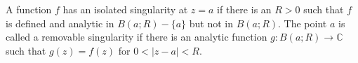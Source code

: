 A function $f$ has an isolated singularity at $z = a$ if there is an $R > 0$ such that $f$ is defined and analytic in $B(a; R) - \{a\}$ but not in $B(a; R)$. The point $a$ is called a removable singularity if there is an analytic function $g: B(a; R) \rightarrow \mathbb{C}$ such that $g(z) = f(z)$ for $0 < |z - a| < R$.
